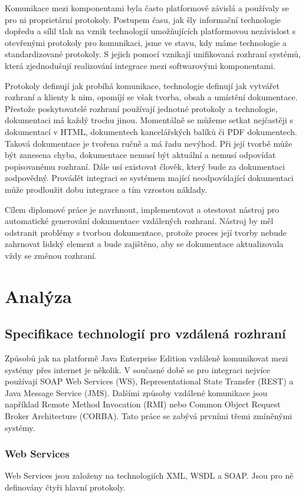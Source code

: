 \documentclass[11pt,twoside,a4paper]{book}
\begin{document}
Komunikace mezi komponentami byla často platformově závislá a používaly se pro ni
proprietární protokoly. Postupem času, jak šly informační technologie dopředu a sílil tlak na
vznik technologií umožňujících platformovou nezávislost s otevřenými protokoly pro
komunikaci, jsme ve stavu, kdy máme technologie a standardizované protokoly. S jejich
pomocí vznikají unifikovaná rozhraní systémů, která zjednodušují realizování integrace mezi
softwarovými komponentami.

Protokoly definují jak probíhá komunikace, technologie definují jak vytvářet rozhraní a
klienty k nim, opomíjí se však tvorba, obsah a umístění dokumentace. Přestože poskytovatelé
rozhraní používají jednotné protokoly a technologie, dokumentaci má každý trochu jinou.
Momentálně se můžeme setkat nejčastěji s dokumentací v HTML, dokumentech
kancelářských balíků či PDF dokumentech. Taková dokumentace je tvořena ručně a má řadu
nevýhod. Při její tvorbě může být zanesena chyba, dokumentace nemusí být aktuální a nemusí
odpovídat popisovanému rozhraní. Dále usí existovat člověk, který bude za dokumentaci
zodpovědný. Provádět integraci se systémem mající neodpovídající dokumentaci může
prodloužit dobu integrace a tím vzrostou náklady.

Cílem diplomové práce je navrhnout, implementovat a otestovat nástroj pro automatické
generování dokumentace vzdálených rozhraní. Nástroj by měl odstranit problémy s tvorbou
dokumentace, protože proces její tvorby nebude zahrnovat lidský element a bude zajištěno,
aby se dokumentace aktualizovala vždy se změnou rozhraní.

\chapter{Analýza}
\section{Specifikace technologií pro vzdálená rozhraní}
Způsobů jak na platformě Java Enterprise Edition vzdáleně komunikovat mezi systémy přes
internet je několik. V současné době se pro integraci nejvíce používají SOAP Web Services
(WS), Representational State Transfer (REST) a Java Message Service (JMS). Dalšími
způsoby vzdálené komunikace jsou například
Remote Method Invocation (RMI) nebo
Common Object Request Broker Architecture (CORBA). Tato práce se zabývá prvními třemi
zmíněnými systémy.


\subsection{Web Services}
Web Services jsou založeny na technologiích XML, WSDL a SOAP. Jsou pro ně
definovány čtyři hlavní protokoly.
\end{document}
